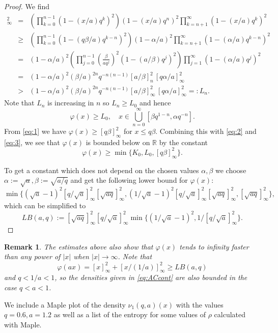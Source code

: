 \documentclass [12pt]{article}
\newtheorem{rem}[thm]{Remark}
\newcommand{\R}{\mathbb{R}}
\begin{document}
\begin{proof}
We find
\begin{eqnarray*}
[x/a]_\infty^2&=&\left(\prod_{k=0}^{n-1}(1-(x/a)q^k)^2\right)(1-(x/a)q^n)^2\prod_{k=n+1}^\infty (1-(x/a)q^k)^2\\
&\ge&\left(\prod_{k=0}^{n-1}(1-(q\beta/a)q^{k-n})^2\right)(1-\alpha/a)^2\prod_{k=n+1}^\infty (1-(\alpha/a)q^{k-n})^2\\
&=& (1-\alpha/a)^2\left(\prod_{j=0}^{n-1} \left(\frac{\beta}{aq^j}\right)^{2}(1-(a/\beta)q^j)^2\right)\prod_{j=1}^\infty(1-(\alpha/a)q^j)^2\\
&=&(1-\alpha/a)^2(\beta/a)^{2n}q^{-n(n-1)}[a/\beta]_n^2\,[q\alpha/a]_\infty^2\\
&>&(1-\alpha/a)^2(\beta/a)^{2n}q^{-n(n-1)}[a/\beta]_\infty^2\,[q\alpha/a]_\infty^2=:L_n.
\end{eqnarray*}
Note that $L_n$ is increasing in $n$ so $L_n\ge L_0$ and hence
\begin{equation}\label{eq:3}
\varphi(x)\ge L_0,\quad x\in\bigcup_{n=0}^\infty [\beta q^{1-n},\alpha q^{-n}].
\end{equation}
From \eqref{eq:1} we have $\varphi(x)\ge [q\beta]_\infty^2$ for $x\le q\beta$.
Combining this with \eqref{eq:2} and \eqref{eq:3}, we see that $\varphi(x)$ is bounded below on $\R$ by the constant
$$
\varphi(x)\ge \min\{K_0,L_0,[q\beta]_\infty^2\}.
$$

To get  a constant which does not depend on the chosen values $\alpha,\beta$ we choose
$\alpha:=\sqrt{a}, \beta:=\sqrt{a/q}$ and get the following lower bound for $\varphi(x)$:
$$
\min\{(\sqrt{a}-1)^2[q/\sqrt{a}]_\infty^2[\sqrt{aq}]_\infty^2, (1/\sqrt{a}-1)^2 [q/\sqrt{a}]_\infty^2[\sqrt{aq}]_\infty^2, [\sqrt{aq}]_\infty^2\},
$$
which can be simplified to
\begin{equation}\label{eq:LB}
LB(a,q):=[\sqrt{aq}]_\infty^2[q/\sqrt{a}]_\infty^2\min\{(1/\sqrt{a}-1)^2, 1/[q/\sqrt{a}]_\infty^2\}.
\end{equation}
\end{proof}
 
\begin{rem}{\rm The estimates above also show that $\varphi(x)$ tends to infinity faster than any power of  $|x|$ when $|x|\to\infty$. Note that 
$$
\varphi(ax)=[x]_\infty^2+[x/(1/a)]_\infty^2\ge LB(a,q)
$$
and $q<1/a<1$, so the densities given in \eqref{eq:ACcont} are also bounded  in the case $q<a<1$.
}
\end{rem} 

\medskip 
We include a Maple plot of the density $\nu_1(q,a)(x)$ with the values $q=0.6, a=1.2$ as 
well as a list of the entropy for some values of $\rho$ calculated with Maple.
\end{document}
